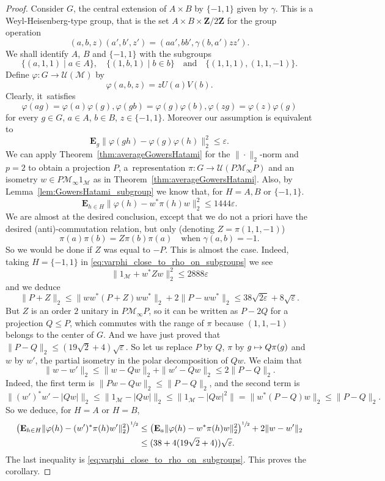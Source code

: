 \documentclass[10pt]{amsart}
\newcommand\mto{\mathchoice{\longmapsto}{\mapsto}{\mapsto}{\mapsto}}
\theoremstyle{plain}
\theoremstyle{definition}
\newcommand{\Z}{\mathbf{Z}}
\newcommand{\cM}{\mathcal{M}}
\newcommand{\E}{\mathbf{E}}
\newcommand{\cU}{\mathcal{U}}
\begin{document}
\begin{proof} Consider $G$, the central extension of $A\times B$ by $\{-1,1\}$ given by $\gamma$. This is a Weyl-Heisenberg-type group, that is the set $A\times B \times \Z/2\Z$ for the group operation
\[
(a,b,z)(a',b',z') = (aa',bb',\gamma(b,a')zz').
\]
We shall identify $A$, $B$ and $\{-1,1\}$ with the subgroups
\[
\{(a,1,1)\mid a \in A\},\quad \{(1,b,1)\mid b \in b\}\quad\text{and}\quad\{(1,1,1),(1,1,-1)\}.
\]
Define $\varphi:G \to \cU(\cM)$ by
\[
\varphi(a,b,z) = z U(a) V(b).
\] Clearly, it~satisfies
\[
\varphi(a g) = \varphi(a) \varphi(g), \varphi(gb) = \varphi(g) \varphi(b), \varphi(zg) = \varphi(z) \varphi(g)
\]
for every $g \in G$, $a \in A$, $b \in B$, $z \in \{-1,1\}$. Moreover our assumption is equivalent to
\[
\E_g \|\varphi(gh) - \varphi(g) \varphi(h)\|_2^2 \leq \varepsilon.
\]
We can apply Theorem~\ref{thm:averageGowersHatami} for the $\|{\cdot}\|_2$-norm and $p=2$ to obtain a projection $P$, a~representation $\pi:G \to \cU(P\cM_\infty P)$ and an isometry $w \in P \cM_\infty 1_\cM$ as in Theorem~\ref{thm:averageGowersHatami}. Also, by Lemma~\ref{lem:GowersHatami_subgroup} we know that, for $H=A,B$ or $\{-1,1\}$.
\begin{equation}\label{eq:varphi_close_to_rho_on_subgroups} \E_{h\in H} \|\varphi(h) - w^* \pi(h) w\|_2^2 \leq 1444 \varepsilon.
\end{equation}
We are almost at the desired conclusion, except that we do not a priori have the desired (anti)-commutation relation, but only (denoting $Z = \pi(1,1,-1)$)
\[
\pi(a) \pi (b) = Z \pi(b) \pi(a)\quad\text{when }\gamma(a,b)=-1.
\]
So we would be done if $Z$ was equal to $-P$. This is almost the case. Indeed, taking $H = \{-1,1\}$ in \eqref{eq:varphi_close_to_rho_on_subgroups} we see
\[
\|1_\cM + w^* Z w\|_2^2 \leq 2888\varepsilon
\]
and we deduce
\[
\| P + Z\|_2 \leq \|ww^* (P+Z)ww^*\|_2 + 2\|P-ww^*\|_2 \leq 38\sqrt{2\varepsilon}+8\sqrt{\varepsilon}.
\]
But $Z$ is an order $2$ unitary in $P \cM_\infty P$, so it can be written as $P-2Q$ for a projection $Q \leq P$, which commutes with the range of $\pi$ because $(1,1,-1)$ belongs to the center of $G$. And we have just proved that $\|P-Q\|_2 \leq (19\sqrt{2}+4)\sqrt \varepsilon$. So let us replace $P$ by $Q$, $\pi$ by $g \mto Q \pi(g)$ and $w$ by $w'$, the partial isometry in the polar decomposition of $Qw$. We claim that
\[
\|w-w'\|_2 \leq \|w - Qw\|_2 + \|w'-Qw\|_2\leq 2 \|P-Q\|_2.
\]
Indeed, the first term is $\|Pw-Qw\|_2 \leq \|P-Q\|_2$, and the second term is
\[
\|(w')^*w' - |Qw|\|_2 \leq \|1_\cM - |Qw|\|_2 \leq \|1_\cM -|Qw|^2\| = \|w^*(P-Q)w\|_2 \leq \|P-Q\|_2.
\]
So we deduce, for $H=A$ or $H=B$,
\begin{align*} \left(\E_{h \in H} \|\varphi(h) - (w')^* \pi(h) w'\|_2^2\right)^{\sfrac 1 2} &\leq \left(\E_a \|\varphi(h) - w^* \pi(h) w\|_2^2\right)^{\sfrac 1 2} + 2\|w-w'\|_2\\
& \leq (38+4(19\sqrt{2}+4))\sqrt{\varepsilon}.
\end{align*}
The last inequality is \eqref{eq:varphi_close_to_rho_on_subgroups}. This proves the corollary.
\end{proof}
\end{document}
